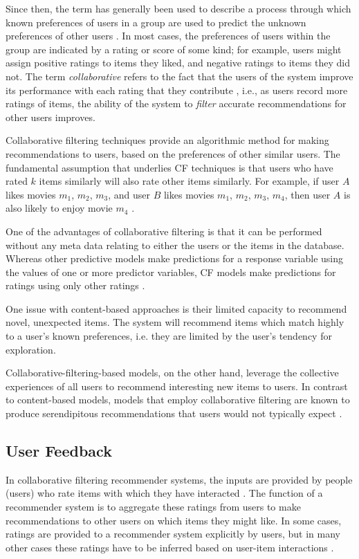 Since then, the term has generally been used to describe a process through which known preferences of users in a group are used to predict the unknown preferences of other users \parencite{cf_1.1}. In most cases, the preferences of users within the group are indicated by a rating or score of some kind; for example, users might assign positive ratings to items they liked, and negative ratings to items they did not. The term \textit{collaborative} refers to the fact that the users of the system improve its performance with each rating that they contribute \parencite{cf_1.2_eigentaste}, i.e., as users record more ratings of items, the ability of the system to \textit{filter} accurate recommendations for other users improves. 

Collaborative filtering techniques provide an algorithmic method for making recommendations to users, based on the preferences of other similar users. The fundamental assumption that underlies CF techniques is that users who have rated $k$ items similarly will also rate other items similarly. For example, if user $A$ likes movies $m_1$, $m_2$, $m_3$, and user $B$ likes movies $m_1$, $m_2$, $m_3$, $m_4$, then user $A$ is also likely to enjoy movie $m_4$ \parencite{cf_1.1}.

One of the advantages of collaborative filtering is that it can be performed without any meta data relating to either the users or the items in the database. Whereas other predictive models make predictions for a response variable using the values of one or more predictor variables, CF models make predictions for ratings using only other ratings \parencite{handbook_1.1_intro}.

One issue with content-based approaches is their limited capacity to recommend novel, unexpected items. The system will recommend items which match highly to a user's known preferences, i.e. they are limited by the user's tendency for exploration. \parencite{handbook_1.3_content-based}

Collaborative-filtering-based models, on the other hand, leverage the collective experiences of all users to recommend interesting new items to users. In contrast to content-based models, models that employ collaborative filtering are known to produce serendipitous recommendations that users would not typically expect \parencite{herlocker2002empirical}.

\subsection{User Feedback}
 In collaborative filtering recommender systems, the inputs are provided by people (users) who rate items with which they have interacted \parencite{cf_1.5_explicit}. The function of a recommender system is to aggregate these ratings from users to make recommendations to other users on which items they might like. In some cases, ratings are provided to a recommender system explicitly by users, but in many other cases these ratings have to be inferred based on user-item interactions \parencite{cf_1.6_implicit}. 

